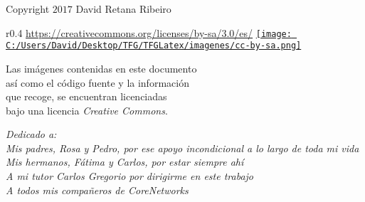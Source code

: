\documentclass[10pt, a4paper, twoside]{report} %
\begin{document}





\newpage
\thispagestyle{empty} %
\null\vfill


\newpage
\thispagestyle{empty} %
\null\vfill

\textcopyright \hspace{0.3cm} Copyright $2017$ David Retana Ribeiro\\

\begin{wrapfigure}{r}{0.4\textwidth}
  \centering \url{https://creativecommons.org/licenses/by-sa/3.0/es/}
  \href{https://creativecommons.org/licenses/by-sa/3.0/es/}
       {\texttt{[image: C:/Users/David/Desktop/TFG/TFGLatex/imagenes/cc-by-sa.png]}}
\end{wrapfigure}
\noindent Las imágenes contenidas en este documento \\
así como el código fuente y la información \\
que recoge, se encuentran licenciadas \\
bajo una licencia \textit{Creative Commons}.

\clearpage

\thispagestyle{empty}
\begin{flushright}
  \textit{Dedicado a: \\
  Mis padres, Rosa y Pedro, por ese apoyo incondicional a lo largo de toda mi vida \\
  Mis hermanos, Fátima y Carlos, por estar siempre ahí\\
  A mi tutor Carlos Gregorio por dirigirme en este trabajo\\
  A todos mis compañeros de CoreNetworks}
\end{flushright}
\end{document}
